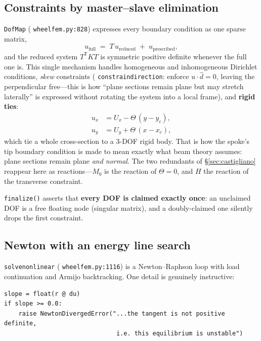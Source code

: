 \documentclass[11pt,a4paper]{article}
\DeclareRobustCommand{\code}[1]{%
  \texttt{\small\def\_{\textunderscore\discretionary{}{}{}}#1}}
\newcommand{\at}[2]{\code{#1:#2}}
\begin{document}
\subsection{Constraints by master--slave elimination}
\label{sec:dofmap}

\code{DofMap} (\at{wheel\_fem.py}{828}) expresses every boundary condition as one
sparse matrix,
%
\begin{equation}
  u_{\text{full}} \;=\; T\,u_{\text{reduced}} \;+\; u_{\text{prescribed}},
\end{equation}
%
and the reduced system $T^{\mathsf T} K T$ is symmetric positive definite whenever the
full one is. This single mechanism handles homogeneous and inhomogeneous Dirichlet
conditions, \emph{skew} constraints (\code{constrain\_direction}: enforce
$u \cdot \hat d = 0$, leaving the perpendicular free---this is how ``plane sections
remain plane but may stretch laterally'' is expressed without rotating the system into
a local frame), and \textbf{rigid ties}:
%
\begin{align}
  u_x &= U_x - \Theta\,(y - y_c), \\
  u_y &= U_y + \Theta\,(x - x_c),
\end{align}
%
which tie a whole cross-section to a 3-DOF rigid body. That is how the spoke's tip
boundary condition is made to mean exactly what beam theory assumes: plane sections
remain plane \emph{and normal}. The two redundants of \S\ref{sec:castigliano} reappear
here as reactions---$M_0$ is the reaction of $\Theta = 0$, and $H$ the reaction of the
transverse constraint.

\code{finalize()} asserts that \textbf{every DOF is claimed exactly once}: an unclaimed
DOF is a free floating node (singular matrix), and a doubly-claimed one silently drops
the first constraint.

\subsection{Newton with an energy line search}
\label{sec:newton}

\code{solve\_nonlinear} (\at{wheel\_fem.py}{1116}) is a Newton--Raphson loop with load
continuation and Armijo backtracking. One detail is genuinely instructive:

\begin{lstlisting}[style=py]
slope = float(r @ du)
if slope >= 0.0:
    raise NewtonDivergedError("...the tangent is not positive definite,
                               i.e. this equilibrium is unstable")
\end{lstlisting}
\end{document}
